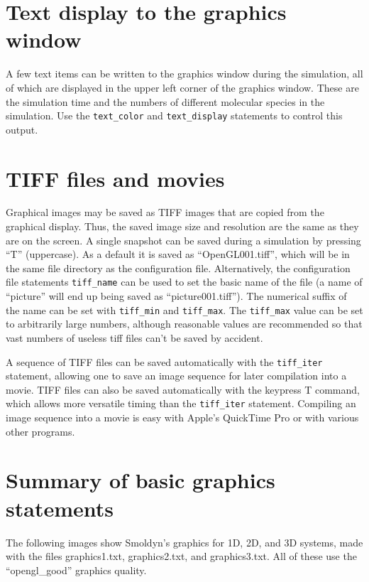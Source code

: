 \documentclass {scrbook}
\newcommand {\ttt} {\texttt}
\begin{document}
\section{Text display to the graphics window}

A few text items can be written to the graphics window during the simulation, all of which are displayed in the upper left corner of the graphics window. These are the simulation time and the numbers of different molecular species in the simulation. Use the \ttt{text\_color} and \ttt{text\_display} statements to control this output.

\section{TIFF files and movies}

Graphical images may be saved as TIFF images that are copied from the graphical display. Thus, the saved image size and resolution are the same as they are on the screen. A single snapshot can be saved during a simulation by pressing ``T'' (uppercase). As a default it is saved as ``OpenGL001.tiff'', which will be in the same file directory as the configuration file. Alternatively, the configuration file statements \ttt{tiff\_name} can be used to set the basic name of the file (a name of ``picture'' will end up being saved as ``picture001.tiff''). The numerical suffix of the name can be set with \ttt{tiff\_min} and \ttt{tiff\_max}. The \ttt{tiff\_max} value can be set to arbitrarily large numbers, although reasonable values are recommended so that vast numbers of useless tiff files can't be saved by accident.

A sequence of TIFF files can be saved automatically with the \ttt{tiff\_iter} statement, allowing one to save an image sequence for later compilation into a movie. TIFF files can also be saved automatically with the keypress T command, which allows more versatile timing than the \ttt{tiff\_iter} statement. Compiling an image sequence into a movie is easy with Apple's QuickTime Pro or with various other programs.

\section{Summary of basic graphics statements}

The following images show Smoldyn's graphics for 1D, 2D, and 3D systems, made with the files graphics1.txt, graphics2.txt, and graphics3.txt. All of these use the ``opengl\_good'' graphics quality.
\end{document}
